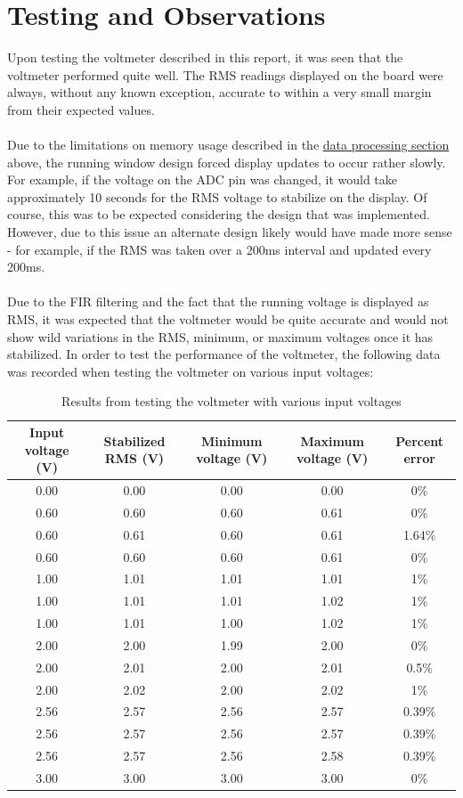 \documentclass[12pt]{report}
\begin{document}
\section{Testing and Observations}
Upon testing the voltmeter described in this report, it was seen that the voltmeter performed quite
well. The RMS readings displayed on the board were always, without any known exception, accurate to
within a very small margin from their expected values.\\\\
Due to the limitations on memory usage described in the \hyperref[dataproc]{data processing section}
above, the running window design forced display updates to occur rather slowly. For example, if the
voltage on the ADC pin was changed, it would take approximately 10 seconds for the RMS voltage to
stabilize on the display. Of course, this was to be expected considering the design that was
implemented. However, due to this issue an alternate design likely would have made more sense - for
example, if the RMS was taken over a 200ms interval and updated every 200ms.\\\\
Due to the FIR filtering and the fact that the running voltage is displayed as RMS, it was expected
that the voltmeter would be quite accurate and would not show wild variations in the RMS, minimum,
or maximum voltages once it has stabilized.
In order to test the performance of the voltmeter, the following data was recorded when testing the
voltmeter on various input voltages:
\begin{table}[h]\label{testdata}
	\caption{Results from testing the voltmeter with various input voltages}
	\begin{center}
		\begin{tabular}{|c|c|c|c|c|}
			\hline
			Input voltage (V) & Stabilized RMS (V) & Minimum voltage (V) & Maximum voltage
			(V) & Percent error\\\hline
			0.00 & 0.00 & 0.00 & 0.00 & 0\%\\\hline
			0.60 & 0.60 & 0.60 & 0.61 & 0\%\\\hline
			0.60 & 0.61 & 0.60 & 0.61 & 1.64\%\\\hline
			0.60 & 0.60 & 0.60 & 0.61 & 0\%\\\hline
			1.00 & 1.01 & 1.01 & 1.01 & 1\%\\\hline
			1.00 & 1.01 & 1.01 & 1.02 & 1\%\\\hline
			1.00 & 1.01 & 1.00 & 1.02 & 1\%\\\hline
			2.00 & 2.00 & 1.99 & 2.00 & 0\%\\\hline
			2.00 & 2.01 & 2.00 & 2.01 & 0.5\%\\\hline
			2.00 & 2.02 & 2.00 & 2.02 & 1\%\\\hline
			2.56 & 2.57 & 2.56 & 2.57 & 0.39\%\\\hline
			2.56 & 2.57 & 2.56 & 2.57 & 0.39\%\\\hline
			2.56 & 2.57 & 2.56 & 2.58 & 0.39\%\\\hline
			3.00 & 3.00 & 3.00 & 3.00 & 0\%\\\hline
		\end{tabular}
	\end{center}
\end{table}
\end{document}

